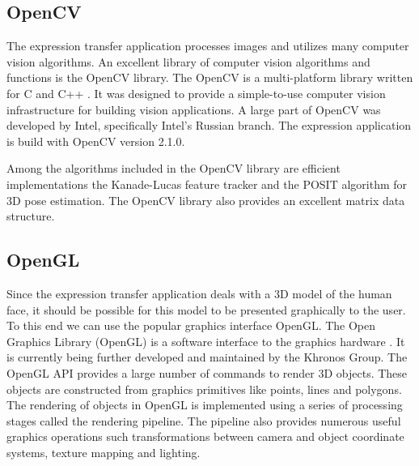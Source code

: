 \documentclass[11pt,a4paper,twoside]{report}
\begin{document}
\subsection{OpenCV}
The expression transfer application processes images and utilizes many computer
vision algorithms. An excellent library of computer vision algorithms and
functions is the OpenCV library. The OpenCV is a multi-platform library
written for C and C++ \cite{opencv}. It was designed to provide a simple-to-use
computer vision infrastructure for building vision applications. A large part
of OpenCV was developed by Intel, specifically Intel's Russian branch. The
expression application is build with OpenCV version 2.1.0.

Among the algorithms included in the OpenCV library are efficient implementations the Kanade-Lucas feature tracker
and the POSIT algorithm for 3D pose estimation. The OpenCV library also provides
an excellent matrix data structure.

\subsection{OpenGL}
Since the expression transfer
application deals with a 3D model of the human face, it should be possible for
this model to be presented graphically to the user. To
this end we can use the popular graphics interface OpenGL. The Open Graphics Library (OpenGL) is a software interface to the graphics
hardware \cite{opengl}. It is currently being further developed and maintained
by the Khronos Group. The OpenGL API provides a large
number of commands to render 3D objects. These objects are constructed
from graphics primitives like points, lines and polygons. The rendering of
objects in OpenGL is
implemented using a series of processing stages called the rendering
pipeline. The pipeline also provides numerous useful graphics operations such transformations
between camera and object coordinate systems, texture mapping and lighting. 
\end{document}
